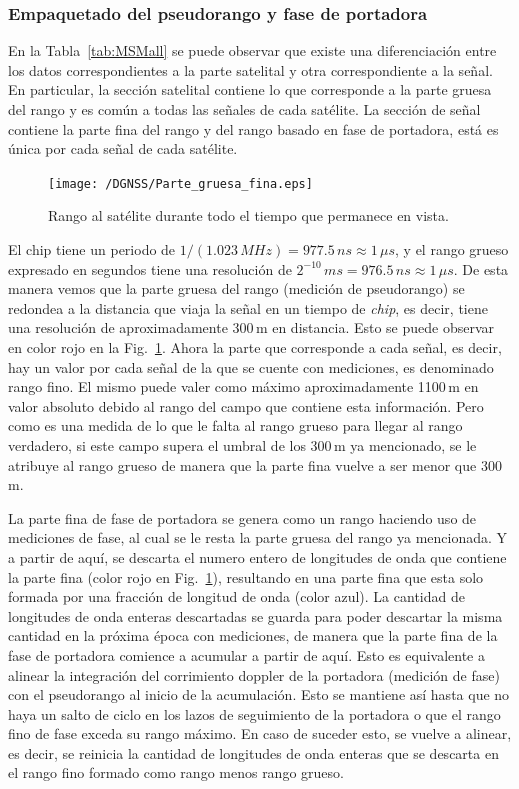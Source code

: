\documentclass[a4paper,12pt,oneside,onecolumn,final,openright]{book}%
\begin{document}
\subsubsection{Empaquetado del pseudorango y fase de portadora}\label{sec:rrng_frng}
	En la Tabla~\ref{tab:MSMall} se puede observar que existe una diferenciación entre los datos correspondientes a la parte satelital y otra correspondiente a la señal. En particular, la sección satelital contiene lo que corresponde a la parte gruesa del rango y es común a todas las señales de cada satélite. La sección de señal contiene la parte fina del rango y del rango basado en fase de portadora, está es única por cada señal de cada satélite. 
	
\begin{figure}
    \centering
    \texttt{[image: /DGNSS/Parte\_gruesa\_fina.eps]}
    \caption{Rango al satélite durante todo el tiempo que permanece en vista.}
    \label{fig:rrng_frng}
\end{figure}
	
	El chip tiene un periodo de $1/(1.023\,MHz) = 977.5\,ns \approx 1\,\mu s$, y el rango grueso expresado en segundos tiene una resolución de $2^{-10}\,ms = 976.5\,ns \approx 1\, \mu s$. De esta manera vemos que la parte gruesa del rango (medición de pseudorango) se redondea a la distancia que viaja la señal en un tiempo de \textit{chip}, es decir, tiene una resolución de aproximadamente 300\,m en distancia. Esto se puede observar en color rojo en la Fig.~\ref{fig:rrng_frng}. Ahora la parte que corresponde a cada señal, es decir, hay un valor por cada señal de la que se cuente con mediciones, es denominado rango fino. El mismo puede valer como máximo aproximadamente 1100\,m en valor absoluto debido al rango del campo que contiene esta información. Pero como es una medida de lo que le falta al rango grueso para llegar al rango verdadero, si este campo supera el umbral de los 300\,m ya mencionado, se le atribuye al rango grueso de manera que la parte fina vuelve a ser menor que 300\,m.
	
	La parte fina de fase de portadora se genera como un rango haciendo uso de mediciones de fase, al cual se le resta la parte gruesa del rango ya mencionada. Y a partir de aquí, se descarta el numero entero de longitudes de onda que contiene la parte fina (color rojo en Fig.~\ref{fig:rrng_frng}), resultando en una parte fina que esta solo formada por una fracción de longitud de onda (color azul). La cantidad de longitudes de onda enteras descartadas se guarda para poder descartar la misma cantidad en la próxima época con mediciones, de manera que la parte fina de la fase de portadora comience a acumular a partir de aquí. Esto es equivalente a alinear la integración del corrimiento doppler de la portadora (medición de fase) con el pseudorango al inicio de la acumulación. Esto se mantiene así hasta que no haya un salto de ciclo en los lazos de seguimiento de la portadora o que el rango fino de fase exceda su rango máximo. En caso de suceder esto, se vuelve a alinear, es decir, se reinicia la cantidad de longitudes de onda enteras que se descarta en el rango fino formado como rango menos rango grueso. 
	
\end{document}
